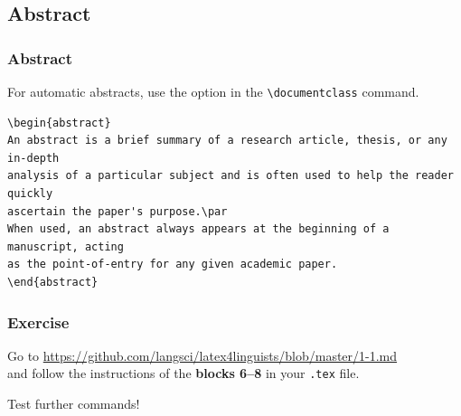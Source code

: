 \subsection{Abstract}

\begin{frame}[fragile]
\frametitle{Abstract}

For automatic abstracts, use the option  in the \lstinline|\documentclass| command.

{\small
\begin{lstlisting}
\begin{abstract}
An abstract is a brief summary of a research article, thesis, or any in-depth 
analysis of a particular subject and is often used to help the reader quickly 
ascertain the paper's purpose.\par 
When used, an abstract always appears at the beginning of a manuscript, acting 
as the point-of-entry for any given academic paper. 
\end{abstract}
\end{lstlisting}
}

\end{frame}


\begin{frame}[fragile]
\frametitle{Exercise}


Go to \url{https://github.com/langsci/latex4linguists/blob/master/1-1.md}\\
and follow the instructions of the \textbf{blocks 6--8} in your \texttt{.tex} file.

\bigskip 

Test further commands!



\end{frame}


